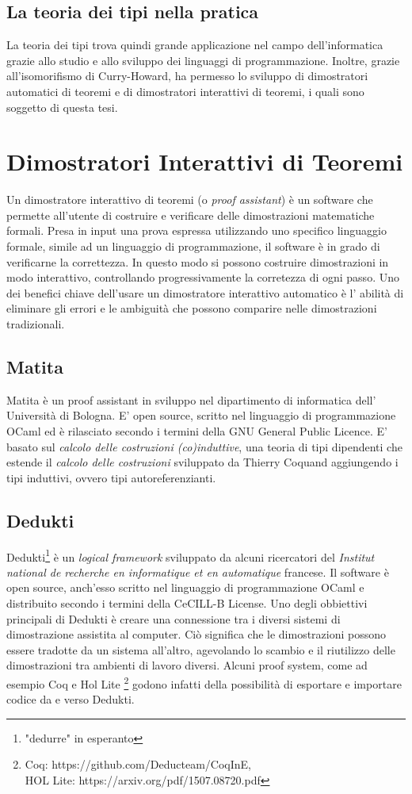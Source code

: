 \documentclass[12pt,a4paper]{report}
\begin{document}
\subsection{La teoria dei tipi nella pratica}
La teoria dei tipi trova quindi grande applicazione nel campo dell'informatica
grazie allo studio e allo sviluppo dei linguaggi di programmazione. Inoltre,
grazie all'isomorifismo di Curry-Howard, ha permesso lo sviluppo di dimostratori
automatici di teoremi e di dimostratori interattivi di teoremi, i quali sono
soggetto di questa tesi.

\section{Dimostratori Interattivi di Teoremi}
Un dimostratore interattivo di teoremi (o \textit{proof assistant}) è un software 
che permette all'utente di costruire e verificare delle dimostrazioni matematiche
formali. Presa in input una prova espressa utilizzando uno specifico linguaggio 
formale, simile ad un linguaggio di programmazione, il software è in grado di
verificarne la correttezza. In questo modo si possono costruire dimostrazioni
in modo interattivo, controllando progressivamente la corretezza di ogni passo.
Uno dei benefici chiave dell'usare un dimostratore interattivo automatico è l'
abilità di eliminare gli errori e le ambiguità che possono comparire nelle 
dimostrazioni tradizionali.

\subsection{Matita}
Matita è un  proof assistant in sviluppo nel dipartimento di informatica dell'
Università di Bologna. E' open source, scritto nel linguaggio di programmazione 
OCaml ed è rilasciato secondo i termini della GNU General Public Licence.
E' basato sul \textit{calcolo delle costruzioni (co)induttive}, una teoria di tipi
dipendenti che estende il \textit{calcolo delle costruzioni} sviluppato da
Thierry Coquand aggiungendo i tipi induttivi, ovvero tipi autoreferenzianti.


\subsection{Dedukti}
Dedukti\footnote{"dedurre" in esperanto} è un \textit{logical framework}
sviluppato da alcuni ricercatori del \textit{Institut national de recherche
en informatique et en automatique} francese. Il software è open source, anch'esso
scritto nel linguaggio di programmazione OCaml e distribuito secondo i termini
della CeCILL-B License. Uno degli obbiettivi principali di Dedukti è creare una
connessione tra i diversi sistemi di dimostrazione assistita al computer. Ciò
significa che le dimostrazioni possono essere tradotte da un sistema all'altro,
agevolando lo scambio e il riutilizzo delle dimostrazioni tra ambienti di lavoro
diversi. Alcuni proof system, come ad esempio Coq e Hol Lite 
\footnote{Coq: https://github.com/Deducteam/CoqInE,\\ HOL Lite: https://arxiv.org/pdf/1507.08720.pdf}
godono infatti della possibilità di esportare e importare codice da e verso Dedukti.
\end{document}
